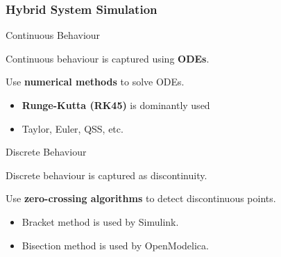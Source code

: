 \begin{frame} \frametitle{ Hybrid System Simulation }
	\vspace{-5pt}
	\begin{block}{Continuous Behaviour}
		\begin{myitemize}
			\item Continuous behaviour is captured using \textbf{ODEs}.
			\item Use \textbf{numerical methods} to solve ODEs.
			\begin{itemize}
				\item \textbf{Runge-Kutta (RK45)} is dominantly used
				\item Taylor, Euler, QSS, etc.
			\end{itemize}
		\end{myitemize}
	\end{block}
	
	\begin{block}{Discrete Behaviour}
		\begin{myitemize}
			\item Discrete behaviour is captured as discontinuity.
			\item Use \textbf{zero-crossing algorithms} to detect discontinuous points.
			\begin{itemize}
				\item {Bracket method} is used by Simulink.
				\item {Bisection method} is used by OpenModelica.
			\end{itemize}
		\end{myitemize}
	\end{block}
\end{frame}


